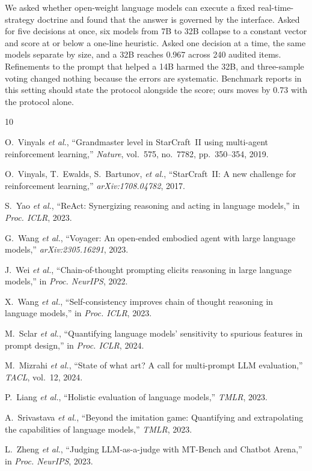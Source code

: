 \documentclass[journal]{IEEEtran}
\begin{document}
We asked whether open-weight language models can execute a fixed real-time-strategy doctrine and
found that the answer is governed by the interface. Asked for five decisions at once, six models
from 7B to 32B collapse to a constant vector and score at or below a one-line heuristic. Asked
one decision at a time, the same models separate by size, and a 32B reaches 0.967 across 240
audited items. Refinements to the prompt that helped a 14B harmed the 32B, and three-sample
voting changed nothing because the errors are systematic. Benchmark reports in this setting
should state the protocol alongside the score; ours moves by 0.73 with the protocol alone.

\begin{thebibliography}{10}

O.~Vinyals \emph{et al.}, ``Grandmaster level in StarCraft~II using multi-agent reinforcement
learning,'' \emph{Nature}, vol.~575, no.~7782, pp.~350--354, 2019.

O.~Vinyals, T.~Ewalds, S.~Bartunov, \emph{et al.}, ``StarCraft~II: A new challenge for
reinforcement learning,'' \emph{arXiv:1708.04782}, 2017.

S.~Yao \emph{et al.}, ``ReAct: Synergizing reasoning and acting in language models,'' in
\emph{Proc. ICLR}, 2023.

G.~Wang \emph{et al.}, ``Voyager: An open-ended embodied agent with large language models,''
\emph{arXiv:2305.16291}, 2023.

J.~Wei \emph{et al.}, ``Chain-of-thought prompting elicits reasoning in large language
models,'' in \emph{Proc. NeurIPS}, 2022.

X.~Wang \emph{et al.}, ``Self-consistency improves chain of thought reasoning in language
models,'' in \emph{Proc. ICLR}, 2023.

M.~Sclar \emph{et al.}, ``Quantifying language models' sensitivity to spurious features in
prompt design,'' in \emph{Proc. ICLR}, 2024.

M.~Mizrahi \emph{et al.}, ``State of what art? A call for multi-prompt LLM evaluation,''
\emph{TACL}, vol.~12, 2024.

P.~Liang \emph{et al.}, ``Holistic evaluation of language models,'' \emph{TMLR}, 2023.

A.~Srivastava \emph{et al.}, ``Beyond the imitation game: Quantifying and extrapolating the
capabilities of language models,'' \emph{TMLR}, 2023.

L.~Zheng \emph{et al.}, ``Judging LLM-as-a-judge with MT-Bench and Chatbot Arena,'' in
\emph{Proc. NeurIPS}, 2023.

\end{thebibliography}
\end{document}
